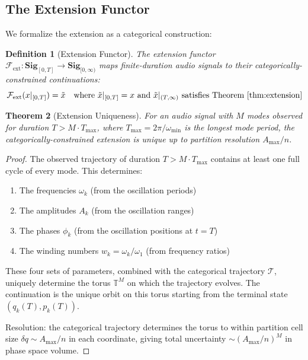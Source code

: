 \documentclass[twocolumn,10pt]{article}
\newtheorem{theorem}{Theorem}[section]
\newtheorem{definition}[theorem]{Definition}
\theoremstyle{remark}
\newcommand{\calF}{\mathcal{F}}
\newcommand{\calT}{\mathcal{T}}
\begin{document}
\subsection{The Extension Functor}

We formalize the extension as a categorical construction:

\begin{definition}[Extension Functor]
\label{def:extension_functor}
The extension functor $\calF_{\mathrm{ext}}: \mathbf{Sig}_{[0,T]} \to \mathbf{Sig}_{[0,\infty)}$ maps finite-duration audio signals to their categorically-constrained continuations:
\begin{equation}
    \calF_{\mathrm{ext}}(x|_{[0,T]}) = \tilde{x} \quad \text{where } \tilde{x}|_{[0,T]} = x \text{ and } \tilde{x}|_{(T,\infty)} \text{ satisfies Theorem~\ref{thm:extension}}
    \label{eq:extension_functor}
\end{equation}
\end{definition}

\begin{theorem}[Extension Uniqueness]
\label{thm:extension_uniqueness}
For an audio signal with $M$ modes observed for duration $T > M \cdot T_{\max}$, where $T_{\max} = 2\pi/\omega_{\min}$ is the longest mode period, the categorically-constrained extension is unique up to partition resolution $A_{\max}/n$.
\end{theorem}

\begin{proof}
The observed trajectory of duration $T > M \cdot T_{\max}$ contains at least one full cycle of every mode. This determines:
\begin{enumerate}
    \item The frequencies $\omega_k$ (from the oscillation periods)
    \item The amplitudes $A_k$ (from the oscillation ranges)
    \item The phases $\phi_k$ (from the oscillation positions at $t = T$)
    \item The winding numbers $w_k = \omega_k/\omega_1$ (from frequency ratios)
\end{enumerate}

These four sets of parameters, combined with the categorical trajectory $\calT$, uniquely determine the torus $\mathbb{T}^M$ on which the trajectory evolves. The continuation is the unique orbit on this torus starting from the terminal state $(q_k(T), p_k(T))$.

Resolution: the categorical trajectory determines the torus to within partition cell size $\delta q \sim A_{\max}/n$ in each coordinate, giving total uncertainty $\sim (A_{\max}/n)^M$ in phase space volume.
\end{proof}
\end{document}
